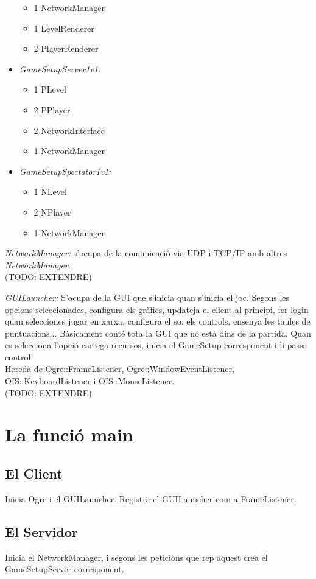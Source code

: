\documentclass[12pt,a4paper,oneside]{article}
\begin{document}
\begin{itemize}
\begin{itemize}
\item 1 NetworkManager
\item 1 LevelRenderer
\item 2 PlayerRenderer
\end{itemize}
\item\textit{GameSetupServer1v1:}
\begin{itemize}
\item 1 PLevel
\item 2 PPlayer
\item 2 NetworkInterface
\item 1 NetworkManager
\end{itemize}
\item\textit{GameSetupSpectator1v1:}
\begin{itemize}
\item 1 NLevel
\item 2 NPlayer
\item 1 NetworkManager
\end{itemize}
\end{itemize}

\textit{NetworkManager:} s'ocupa de la comunicació via UDP i TCP/IP amb altres \textit{NetworkManager}.\\ (TODO: EXTENDRE)

\textit{GUILauncher:} S'ocupa de la GUI que s'inicia quan s'inicia el joc. Segons les opcions seleccionades, configura els gràfics,  updateja el client al principi, fer login quan selecciones jugar en xarxa, configura el so, els controls, ensenya les taules de puntuacions... Bàsicament conté tota la GUI que no està dins de la partida. Quan es selecciona l'opció carrega recursos, inicia el GameSetup corresponent i li passa control.\\
Hereda de Ogre::FrameListener, Ogre::WindowEventListener, OIS::KeyboardListener i OIS::MouseListener.\\ (TODO: EXTENDRE)

\section{La funció main}
\subsection{El Client}
Inicia Ogre i el GUILauncher. Registra el GUILauncher com a FrameListener.

\subsection{El Servidor}
Inicia el NetworkManager, i segons les peticions que rep aquest crea el GameSetupServer corresponent.
\end{document}
